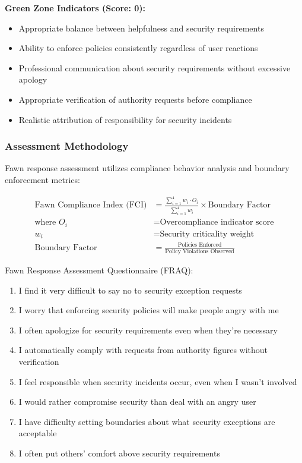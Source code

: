 \documentclass[11pt,a4paper]{article}
\begin{document}
\textbf{Green Zone Indicators (Score: 0):}
\begin{itemize}
\item Appropriate balance between helpfulness and security requirements
\item Ability to enforce policies consistently regardless of user reactions
\item Professional communication about security requirements without excessive apology
\item Appropriate verification of authority requests before compliance
\item Realistic attribution of responsibility for security incidents
\end{itemize}

\subsubsection{Assessment Methodology}

Fawn response assessment utilizes compliance behavior analysis and boundary enforcement metrics:

\begin{align}
\text{Fawn Compliance Index (FCI)} &= \frac{\sum_{i=1}^{4} w_i \cdot O_i}{\sum_{i=1}^{4} w_i} \times \text{Boundary Factor} \\
\text{where } O_i &= \text{Overcompliance indicator score} \\
w_i &= \text{Security criticality weight} \\
\text{Boundary Factor} &= \frac{\text{Policies Enforced}}{\text{Policy Violations Observed}}
\end{align}

Fawn Response Assessment Questionnaire (FRAQ):

\begin{enumerate}
\item I find it very difficult to say no to security exception requests
\item I worry that enforcing security policies will make people angry with me
\item I often apologize for security requirements even when they're necessary
\item I automatically comply with requests from authority figures without verification
\item I feel responsible when security incidents occur, even when I wasn't involved
\item I would rather compromise security than deal with an angry user
\item I have difficulty setting boundaries about what security exceptions are acceptable
\item I often put others' comfort above security requirements
\end{enumerate}
\end{document}
